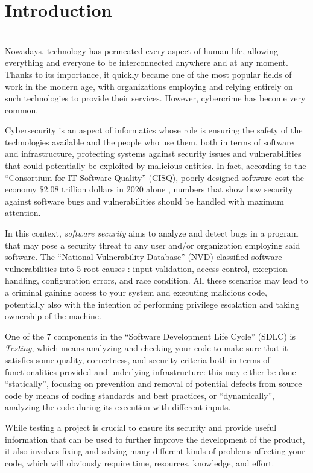 \chapter{Introduction}
\ \\

Nowadays, technology has permeated every aspect of human life, allowing everything and everyone to be interconnected anywhere and at any moment. Thanks to its importance, it quickly became one of the most popular fields of work in the modern age, with organizations employing and relying entirely on such technologies to provide their services. However, cybercrime has become very common. 

Cybersecurity is an aspect of informatics whose role is ensuring the safety of the technologies available and the people who use them, both in terms of software and infrastructure, protecting systems against security issues and vulnerabilities that could potentially be exploited by malicious entities. In fact, according to the ``Consortium for IT Software Quality'' (CISQ), poorly designed software cost the economy $\$2.08$ trillion dollars in 2020 alone \cite{forbes}, numbers that show how security against software bugs and vulnerabilities should be handled with maximum attention.

In this context, \textit{software security} aims to analyze and detect bugs in a program that may pose a security threat to any user and/or organization employing said software. The ``National Vulnerability Database'' (NVD) classified software vulnerabilities into 5 root causes \cite{nist}: input validation, access control, exception handling, configuration errors, and race condition. All these scenarios may lead to a criminal gaining access to your system and executing malicious code, potentially also with the intention of performing privilege escalation and taking ownership of the machine. 

One of the 7 components in the ``Software Development Life Cycle'' (SDLC) is \textit{Testing}, which means analyzing and checking your code to make sure that it satisfies some quality, correctness, and security criteria both in terms of functionalities provided and underlying infrastructure: this may either be done ``statically'', focusing on prevention and removal of potential defects from source code by means of coding standards and best practices, or ``dynamically'', analyzing the code during its execution with different inputs.

While testing a project is crucial to ensure its security and provide useful information that can be used to further improve the development of the product, it also involves fixing and solving many different kinds of problems affecting your code, which will obviously require time, resources, knowledge, and effort.   






